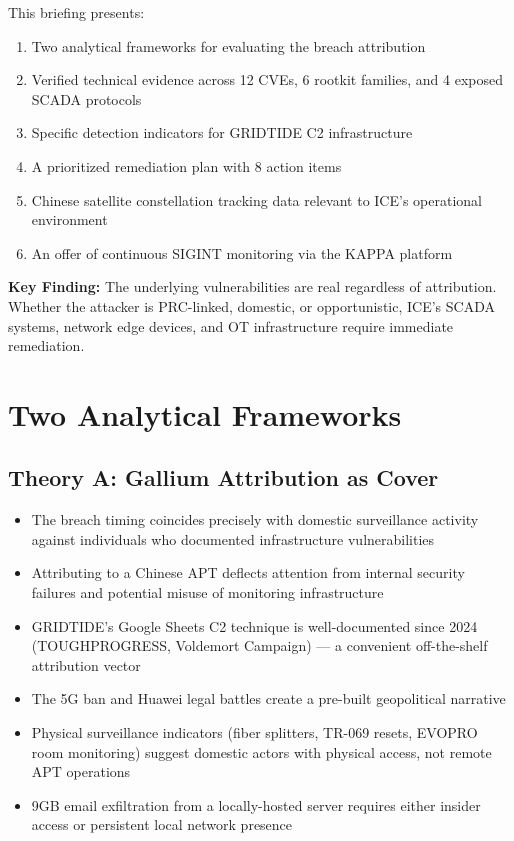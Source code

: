 \documentclass[11pt,a4paper]{article}
\begin{document}
This briefing presents:
\begin{enumerate}[label=\arabic*.]
  \item Two analytical frameworks for evaluating the breach attribution
  \item Verified technical evidence across 12 CVEs, 6 rootkit families, and 4 exposed SCADA protocols
  \item Specific detection indicators for GRIDTIDE C2 infrastructure
  \item A prioritized remediation plan with 8 action items
  \item Chinese satellite constellation tracking data relevant to ICE's operational environment
  \item An offer of continuous SIGINT monitoring via the KAPPA platform
\end{enumerate}

\textbf{Key Finding:} The underlying vulnerabilities are real regardless of attribution. Whether the attacker is PRC-linked, domestic, or opportunistic, ICE's SCADA systems, network edge devices, and OT infrastructure require immediate remediation.

\section{Two Analytical Frameworks}

\subsection{Theory A: Gallium Attribution as Cover}

\begin{itemize}[leftmargin=1.5em]
  \item The breach timing coincides precisely with domestic surveillance activity against individuals who documented infrastructure vulnerabilities
  \item Attributing to a Chinese APT deflects attention from internal security failures and potential misuse of monitoring infrastructure
  \item GRIDTIDE's Google Sheets C2 technique is well-documented since 2024 (TOUGHPROGRESS, Voldemort Campaign) — a convenient off-the-shelf attribution vector
  \item The 5G ban and Huawei legal battles create a pre-built geopolitical narrative
  \item Physical surveillance indicators (fiber splitters, TR-069 resets, EVOPRO room monitoring) suggest domestic actors with physical access, not remote APT operations
  \item 9GB email exfiltration from a locally-hosted server requires either insider access or persistent local network presence
\end{itemize}
\end{document}
